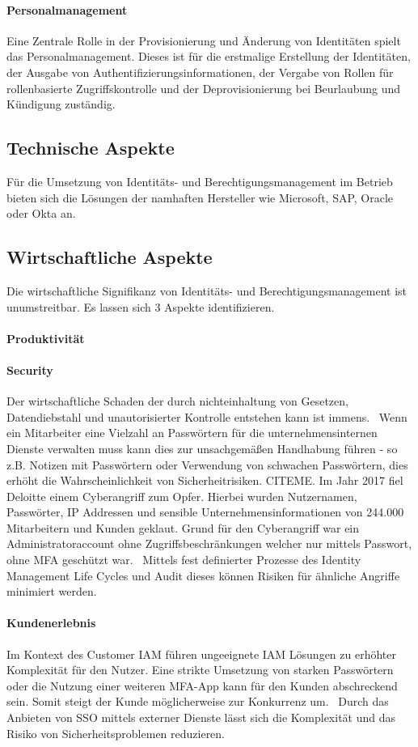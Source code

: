 \documentclass[10pt]{article}
\begin{document}
\paragraph{Personalmanagement}
Eine Zentrale Rolle in der Provisionierung und Änderung von Identitäten spielt das Personalmanagement. Dieses ist für die erstmalige Erstellung der Identitäten, der Ausgabe von Authentifizierungsinformationen, der Vergabe von Rollen für rollenbasierte Zugriffskontrolle und der Deprovisionierung bei Beurlaubung und Kündigung zuständig.~\cite{YOUNG20045}
\subsection{Technische Aspekte}
Für die Umsetzung von Identitäts- und Berechtigungsmanagement im Betrieb bieten sich die Lösungen der namhaften Hersteller wie Microsoft, SAP, Oracle oder Okta an.
\subsection{Wirtschaftliche Aspekte}
Die wirtschaftliche Signifikanz von Identitäts- und Berechtigungsmanagement ist unumstreitbar. Es lassen sich 3 Aspekte identifizieren.
\paragraph{Produktivität}
\paragraph{Security}
Der wirtschaftliche Schaden der durch nichteinhaltung von Gesetzen, Datendiebstahl und unautorisierter Kontrolle entstehen kann ist immens.~\cite{azhar2014economics} Wenn ein Mitarbeiter eine Vielzahl an Passwörtern für die unternehmensinternen Dienste verwalten muss kann dies zur unsachgemäßen Handhabung führen - so z.B. Notizen mit Passwörtern oder Verwendung von schwachen Passwörtern, dies erhöht die Wahrscheinlichkeit von Sicherheitrisiken. CITEME. Im Jahr 2017 fiel Deloitte einem Cyberangriff zum Opfer. Hierbei wurden Nutzernamen, Passwörter, IP Addressen und sensible Unternehmensinformationen von 244.000 Mitarbeitern und Kunden geklaut. Grund für den Cyberangriff war ein Administratoraccount ohne Zugriffsbeschränkungen welcher nur mittels Passwort, ohne MFA geschützt war.~\cite{deloitte2017} Mittels fest definierter Prozesse des Identity Management Life Cycles und Audit dieses können Risiken für ähnliche Angriffe minimiert werden.
\paragraph{Kundenerlebnis}
Im Kontext des Customer IAM führen ungeeignete IAM Lösungen zu erhöhter Komplexität für den Nutzer. Eine strikte Umsetzung von starken Passwörtern oder die Nutzung einer weiteren MFA-App kann für den Kunden abschreckend sein. Somit steigt der Kunde möglicherweise zur Konkurrenz um.~\cite{azhar2014economics} Durch das Anbieten von SSO mittels externer Dienste lässt sich die Komplexität und das Risiko von Sicherheitsproblemen reduzieren.
\end{document}
